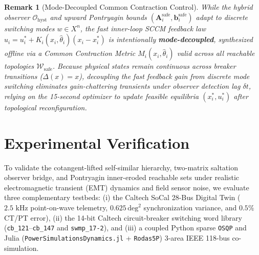 \documentclass[11pt]{article}
\newtheorem{remark}{Remark}
\begin{document}
\begin{remark}[Mode-Decoupled Common Contraction Control]
While the hybrid observer $\mathcal{O}_{\mathrm{hyst}}$ and upward Pontryagin bounds $(\mathbf{A}_i^{\mathrm{safe}}, \mathbf{b}_i^{\mathrm{safe}})$ adapt to discrete switching modes $w \in X^n$, the fast inner-loop SCCM feedback law $u_i = u_i^* + K_i(x_i, \hat{\theta}_i)(x_i - x_i^*)$ is intentionally \textbf{mode-decoupled}, synthesized offline via a Common Contraction Metric $M_i(x_i, \hat{\theta}_i)$ valid across all reachable topologies $\mathcal{W}_{\mathrm{safe}}$. Because physical states remain continuous across breaker transitions ($\Delta(x) = x$), decoupling the fast feedback gain from discrete mode switching eliminates gain-chattering transients under observer detection lag $\delta t$, relying on the 15-second optimizer to update feasible equilibria $(x_i^*, u_i^*)$ after topological reconfiguration.
\end{remark}

\section{Experimental Verification}
To validate the cotangent-lifted self-similar hierarchy, two-matrix saltation observer bridge, and Pontryagin inner-eroded reachable sets under realistic electromagnetic transient (EMT) dynamics and field sensor noise, we evaluate three complementary testbeds: (i) the Caltech SoCal 28-Bus Digital Twin ($2.5\text{ kHz}$ point-on-wave telemetry, $0.625\,\text{deg}^2$ synchronization variance, and $0.5\%$ CT/PT error), (ii) the 14-bit Caltech circuit-breaker switching word library (\texttt{cb\_121}--\texttt{cb\_147} and \texttt{swmp\_17-2}), and (iii) a coupled Python sparse \texttt{OSQP} and Julia (\texttt{PowerSimulationsDynamics.jl} + \texttt{Rodas5P}) $3$-area IEEE 118-bus co-simulation.
\end{document}
